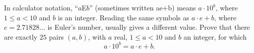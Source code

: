 In calculator notation, ``$a$E$b$'' (sometimes written ae$+$b) means $a\cdot10^b$, where $1\le a<10$ and $b$ is an integer. Reading the same symbols as $a\cdot e+b$, where $e=2.71828\ldots$ is Euler's number, usually gives a different value. Prove that there are exactly $25$ pairs $(a,b)$, with $a$ real, $1\le a<10$ and $b$ an integer, for which
\[a\cdot10^b=a\cdot e+b.\]
